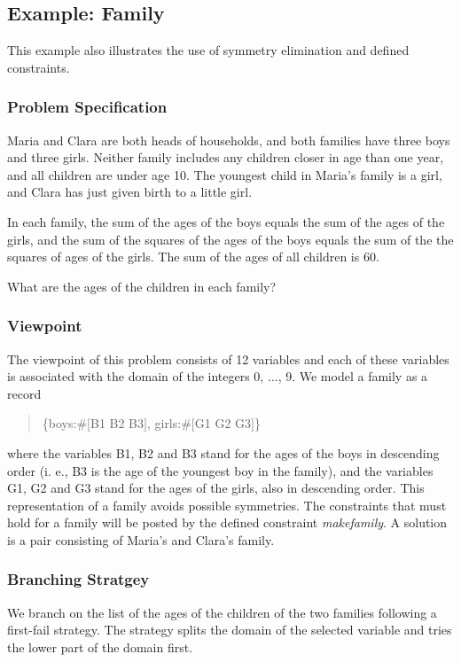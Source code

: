\documentclass[a4paper,halfparskip]{scrartcl}
\begin{document}
\newpage
\subsection{Example: Family}
This example also illustrates the use of symmetry elimination and
defined constraints.

\subsubsection{Problem Specification}
Maria and Clara are both heads of households, and both families 
have three boys and three girls. Neither family includes any children closer 
in age than one year, and all children are under age 10. The youngest child 
in Maria's family is a girl, and Clara has just given birth to a little girl.

In each family, the sum of the ages of the boys equals the sum of the ages 
of the girls, and the sum of the squares of the ages of the boys equals the 
sum of the the squares of ages of the girls. The sum of the ages of all children 
is 60.

What are the ages of the children in each family? 

\subsubsection{Viewpoint}
The viewpoint of this problem consists of 12 variables
and each of these variables is associated with the domain of the integers
0, $\ldots$, 9. 
We model a family as a record
\begin{quote}
\{boys:$ \#[ $B1 B2 B3$]$, girls:$\#[$G1 G2 G3$]$\}
\end{quote}
where the variables B1, B2 and B3 stand for the ages of the boys in descending 
order (i. e., B3 is the age of the youngest boy in the family), and the variables 
G1, G2 and G3 stand for the ages of the girls, also in descending order. This 
representation of a family avoids possible symmetries. The constraints that must 
hold for a family will be posted by the defined constraint \emph{makefamily}.
A solution is a pair consisting of Maria's and Clara's family. 

\subsubsection{Branching Stratgey}
We branch on the list of the ages of the children of the two families following 
a first-fail strategy. The strategy splits the domain of the selected variable and 
tries the lower part of the domain first.
\end{document}
